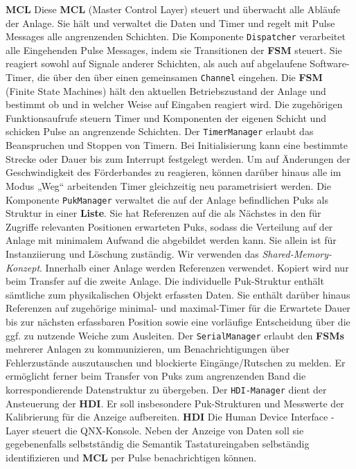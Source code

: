 \documentclass[
   draft=false
  ,paper=a4
  ,twoside=true
  ,fontsize=11pt
  ,headsepline
  ,DIV11
  ,parskip=full+
]{scrartcl} %
\begin{document}
\textbf{MCL}\newline
Diese \textbf{MCL} (Master Control Layer) steuert und überwacht alle Abläufe der Anlage. Sie hält und verwaltet die Daten und Timer und regelt mit Pulse Messages alle angrenzenden Schichten.
Die Komponente \texttt{Dispatcher} verarbeitet alle Eingehenden Pulse Messages, indem sie Transitionen der \textbf{FSM} steuert. Sie reagiert sowohl auf Signale anderer Schichten, als auch auf abgelaufene Software-Timer, die über den über einen gemeinsamen \texttt{Channel} eingehen.\newline
\newline
Die \textbf{FSM} (Finite State Machines) hält den aktuellen Betriebszustand der Anlage und bestimmt ob und in welcher Weise auf Eingaben reagiert wird. Die zugehörigen Funktionsaufrufe steuern Timer und Komponenten der eigenen Schicht und schicken Pulse an angrenzende Schichten.
Der \texttt{TimerManager} erlaubt das Beanspruchen und Stoppen von Timern.  Bei Initialisierung kann eine bestimmte Strecke oder Dauer bis zum Interrupt festgelegt werden. Um auf Änderungen der Geschwindigkeit des Förderbandes zu reagieren, können darüber hinaus alle im Modus „Weg“ arbeitenden Timer gleichzeitig neu parametrisiert werden.\newline
Die Komponente \texttt{PukManager} verwaltet die auf der Anlage befindlichen Puks als Struktur in einer \textbf{Liste}. Sie hat Referenzen auf die als Nächstes in den für Zugriffe relevanten Positionen erwarteten Puks, sodass die Verteilung auf der Anlage mit minimalem Aufwand die abgebildet werden kann. Sie allein ist für Instanziierung und Löschung zuständig. Wir verwenden das \emph{Shared-Memory-Konzept}. Innerhalb einer Anlage werden Referenzen verwendet. Kopiert wird nur beim Transfer auf die zweite Anlage.
Die individuelle Puk-Struktur enthält sämtliche zum physikalischen Objekt erfassten Daten. Sie enthält darüber hinaus Referenzen auf zugehörige minimal- und maximal-Timer für die Erwartete Dauer bis zur nächsten erfassbaren Position sowie eine vorläufige Entscheidung über die ggf. zu nutzende Weiche zum Ausleiten.\newline
Der \texttt{SerialManager} erlaubt den \textbf{FSMs} mehrerer Anlagen zu kommunizieren, um Benachrichtigungen über Fehlerzustände auszutauschen und blockierte Eingänge/Rutschen zu melden. Er ermöglicht ferner beim Transfer von Puks zum angrenzenden Band die korrespondierende Datenstruktur zu übergeben.\newline
Der \texttt{HDI-Manager} dient der Ansteuerung  der \textbf{HDI}. Er soll insbesondere Puk-Strukturen und Messwerte der Kalibrierung  für die Anzeige aufbereiten.
\newline
\textbf{HDI}\newline
Die Human Device Interface - Layer steuert die QNX-Konsole. Neben der Anzeige von Daten soll sie gegebenenfalls selbstständig die Semantik Tastatureingaben selbständig identifizieren und \textbf{MCL} per Pulse benachrichtigen können.
\end{document}
